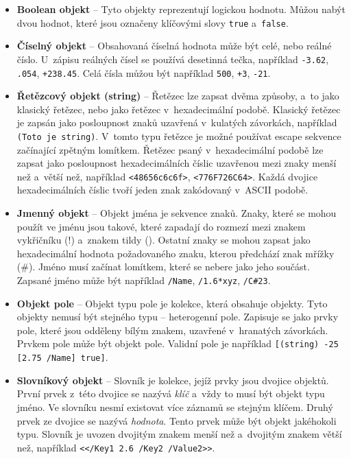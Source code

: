 \begin{itemize}
    \item \textbf{Boolean objekt} -- Tyto objekty reprezentují logickou hodnotu.
    Můžou nabýt dvou hodnot, které jsou označeny klíčovými slovy \texttt{true}
    a~\texttt{false}.
    
    \item \textbf{Číselný objekt} -- Obsahovaná číselná hodnota může být celé,
    nebo reálné číslo. U~zápisu reálných čísel se používá desetinná tečka,
    například \texttt{-3.62}, \texttt{.054}, \texttt{+238.45}. Celá čísla můžou
    být například \texttt{500}, \texttt{+3}, \texttt{-21}.
    
    \item \textbf{Řetězcový objekt (string)} -- Řetězec lze zapsat dvěma způsoby,
    a~to jako klasický řetězec, nebo jako řetězec v~hexadecimální podobě. Klasický
    řetězec je zapsán jako posloupnost znaků uzavřená v~kulatých závorkách,
    například \texttt{(Toto je string)}. V~tomto typu řetězce je možné používat
    escape sekvence začínající zpětným lomítkem. Řetězec psaný v~hexadecimální
    podobě lze zapsat jako posloupnost hexadecimálních číslic uzavřenou mezi znaky
    menší než a~větší než, například \texttt{<48656c6c6f>}, \texttt{<776F726C64>}.
    Každá dvojice hexadecimálních číslic tvoří jeden znak zakódovaný v~ASCII
    podobě.
    
    \item \textbf{Jmenný objekt} -- Objekt jména je sekvence znaků. Znaky, které
    se mohou použít ve jménu jsou takové, které zapadají do rozmezí mezi znakem
    vykřičníku (!) a~znakem tildy (\texttildelow). Ostatní znaky se mohou zapsat
    jako hexadecimální hodnota požadovaného znaku, kterou předchází znak mřížky
    (\#). Jméno musí začínat lomítkem, které se nebere jako jeho součást. Zapsané
    jméno může být například \texttt{/Name}, \texttt{/1.6*xyz}, \texttt{/C\#23}.
    
    \item \textbf{Objekt pole} -- Objekt typu pole je kolekce, která obsahuje
    objekty. Tyto objekty nemusí být stejného typu -- heterogenní pole.
    Zapisuje se jako prvky pole, které jsou odděleny bílým znakem, uzavřené
    v~hranatých závorkách. Prvkem pole může být objekt pole. Validní pole je
    například \texttt{[(string) -25 [2.75 /Name] true]}.
    
    \item \textbf{Slovníkový objekt} -- Slovník je kolekce, jejíž prvky jsou
    dvojice objektů. První prvek z~této dvojice se nazývá \emph{klíč} a~vždy to 
    musí být objekt typu jméno. Ve slovníku nesmí existovat více záznamů se
    stejným klíčem. Druhý prvek ze dvojice se nazývá \emph{hodnota}.
    Tento prvek může být objekt jakéhokoli typu. Slovník je uvozen dvojitým znakem
    menší než a~dvojitým znakem větší než, například
    \texttt{<</Key1 2.6 /Key2 /Value2>>}.


\end{itemize}

